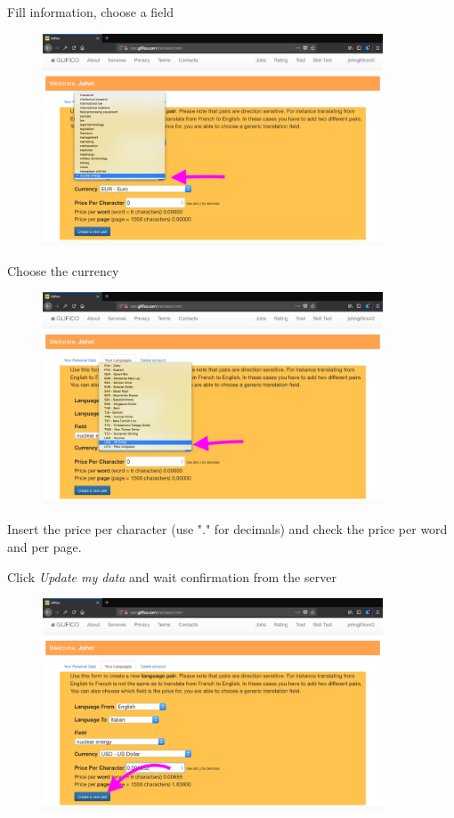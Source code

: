 \documentclass[11 pt, a4paper]{article}
\begin{document}
\clearpage
Fill information, choose a field 
\begin{figure}[H]
\centering
\includegraphics[width=0.9\textwidth]{translator_pair2.png}
\end{figure}

Choose the currency
\begin{figure}[H]
\centering
\includegraphics[width=0.9\textwidth]{translator_pair3.png}
\end{figure}
Insert the price per character (use "." for decimals) and check the price per word and per page.

\clearpage
Click \textit{Update my data} and wait confirmation from the server
\begin{figure}[H]
\centering
\includegraphics[width=0.9\textwidth]{translator_pair4.png}
\end{figure}
\end{document}
